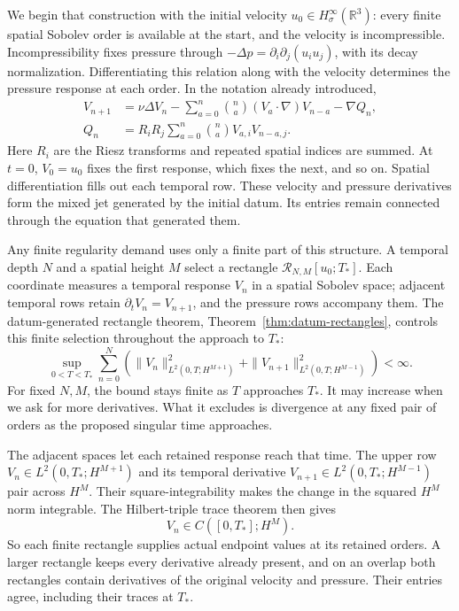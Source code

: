We begin that construction with the initial velocity
\(u_0\in H^\infty_\sigma(\mathbb R^3)\): every finite spatial Sobolev
order is available at the start, and the velocity is incompressible.
Incompressibility fixes pressure through
\(-\Delta p=\partial_i\partial_j(u_i u_j)\), with its decay normalization.
Differentiating this relation along with the velocity determines the
pressure response at each order. In the notation already introduced,
\[
 \begin{aligned}
 V_{n+1}&=\nu\Delta V_n
 -\sum_{a=0}^n\binom na(V_a\cdot\nabla)V_{n-a}-\nabla Q_n,\\
 Q_n&=R_iR_j\sum_{a=0}^n\binom na V_{a,i}V_{n-a,j}.
 \end{aligned}
\]
Here \(R_i\) are the Riesz transforms and repeated spatial indices are
summed. At \(t=0\), \(V_0=u_0\) fixes the first response, which fixes the
next, and so on. Spatial differentiation fills out each temporal row.
These velocity and pressure derivatives form the mixed jet generated by
the initial datum. Its entries remain connected through the equation
that generated them.

Any finite regularity demand uses only a finite part of this structure.
A temporal depth \(N\) and a spatial height \(M\) select a rectangle
\(\mathcal R_{N,M}[u_0;T_*]\). Each coordinate measures a temporal response
\(V_n\) in a spatial Sobolev space; adjacent temporal rows retain
\(\partial_tV_n=V_{n+1}\), and the pressure rows accompany them.
The datum-generated rectangle theorem, Theorem~\ref{thm:datum-rectangles},
controls this finite selection throughout the approach to \(T_*\):
\[
 \sup_{0<T<T_*}\sum_{n=0}^{N}\left(
 \|V_n\|_{L^2(0,T;H^{M+1})}^2
 +\|V_{n+1}\|_{L^2(0,T;H^{M-1})}^2
 \right)<\infty.
\]
For fixed \(N,M\), the bound stays finite as \(T\) approaches \(T_*\).
It may increase when we ask for more derivatives. What it excludes is
divergence at any fixed pair of orders as the proposed singular time
approaches.

The adjacent spaces let each retained response reach that time.
The upper row \(V_n\in L^2(0,T_*;H^{M+1})\) and its temporal derivative
\(V_{n+1}\in L^2(0,T_*;H^{M-1})\) pair across \(H^M\).
Their square-integrability makes the change in the squared \(H^M\) norm
integrable. The Hilbert-triple trace theorem then gives
\[
 V_n\in C([0,T_*];H^M).
\]
So each finite rectangle supplies actual endpoint values at its retained
orders. A larger rectangle keeps every derivative already present, and
on an overlap both rectangles contain derivatives of the original velocity
and pressure. Their entries agree, including their traces at \(T_*\).

